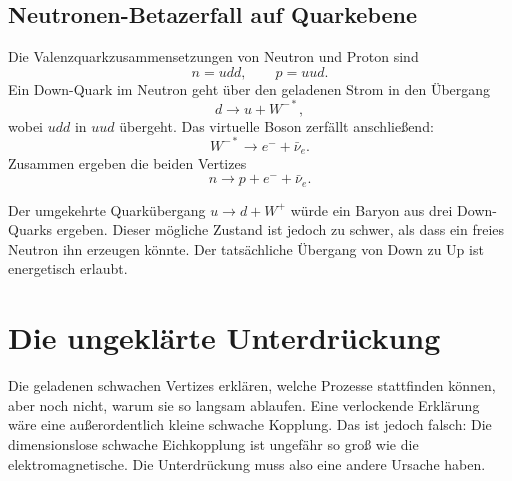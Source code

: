\subsection{Neutronen-Betazerfall auf Quarkebene}

Die Valenzquarkzusammensetzungen von Neutron und Proton sind
\begin{equation}
n=udd,
\qquad
p=uud.
\end{equation}
Ein Down-Quark im Neutron geht über den geladenen Strom in den Übergang
\begin{equation}
d\longrightarrow u+W^{-*},
\end{equation}
wobei \(udd\) in \(uud\) übergeht. Das virtuelle Boson zerfällt anschließend:
\begin{equation}
W^{-*}\longrightarrow e^-+\bar\nu_e.
\end{equation}
Zusammen ergeben die beiden Vertizes
\begin{equation}
n\longrightarrow p+e^-+\bar\nu_e.
\end{equation}

Der umgekehrte Quarkübergang \(u\to d+W^+\) würde ein Baryon aus drei Down-Quarks ergeben. Dieser mögliche Zustand ist jedoch zu schwer, als dass ein freies Neutron ihn erzeugen könnte. Der tatsächliche Übergang von Down zu Up ist energetisch erlaubt.

\begin{classroomqa}
\end{classroomqa}

\section{Die ungeklärte Unterdrückung}

Die geladenen schwachen Vertizes erklären, welche Prozesse stattfinden können, aber noch nicht, warum sie so langsam ablaufen. Eine verlockende Erklärung wäre eine außerordentlich kleine schwache Kopplung. Das ist jedoch falsch: Die dimensionslose schwache Eichkopplung ist ungefähr so groß wie die elektromagnetische. Die Unterdrückung muss also eine andere Ursache haben.

